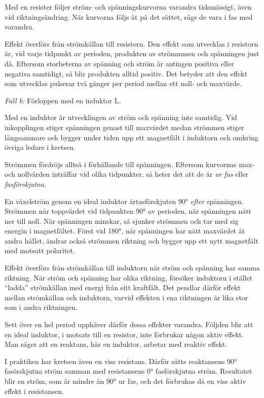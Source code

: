 Med en resister följer ström- och spänningskurvorna varandra tidsmässigt, även
vid riktningsändring. När kurvorna följs åt på det sättet, sägs de vara i fas
med varandra.

Effekt överförs från strömkällan till resistorn. Den effekt som utvecklas i
resistorn är, vid varje tidpunkt av perioden, produkten av strömmmen och
spänningen just då. Eftersom storheterna av spänning och ström är antingen
positiva eller negativa samtidigt, så blir produkten alltid positiv. Det betyder
att den effekt som utvecklas pulserar två gånger per period mellan ett noll- och
maxvärde.

\emph{Fall b:} Förloppen med en induktor L.

Med en induktor är utvecklingen av ström och spänning inte samtidig. Vid
inkopplingen stiger spänningen genast till maxvärdet medan strömmen stiger
långsammare och bygger under tiden upp ett magnetfält i induktorn och omkring
övriga ledare i kretsen.

Strömmen fördröjs alltså i förhållande till spänningen. Eftersom kurvornas max-
och nollvärden inträffar vid olika tidpunkter, så heter det att de är
\emph{ur fas} eller \emph{fasförskjutna}.

En växelström genom en ideal induktor ärtasförskjuten 90° \emph{efter}
spänningen. Strömmen når toppvärdet vid tidpunkten 90° av perioden, när
spänningen nått ner till noll. När spänningen minskar, så sjunker strömmen och
tar med sig energin i magnetfältet. Först vid 180°, när spänningen har nått
maxvärdet åt andra hållet, ändrar också strömmen riktning och bygger upp ett
nytt magnetfält med motsatt polaritet.

Effekt överförs från strömkällan till induktorn när ström och spänning har samma
riktning. När ström och spänning har olika riktning, försöker induktorn i
stället ``ladda'' strömkällan med energi från sitt kraftfält. Det pendlar därför
effekt mellan strömkällan och induktorn, varvid effekten i ena riktningen är
lika stor som i andra riktningen.

Sett över en hel period upphäver därför dessa effekter varandra. Följden blir
att en ideal induktor, i motsats till en resistor, inte förbrukar någon aktiv
effekt. Man säger att en reaktans, här en induktor, arbetar med reaktiv effekt.

I praktiken har kretsen även en viss resistans. Därför sätts reaktansens 90°
fasörskjutna ström samman med resistansens 0° fasförskjutna ström. Resultatet
blir en ström, som är mindre än 90° ur fas, och det förbrukas då en viss aktiv
effekt i resistansen.


